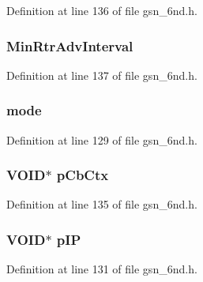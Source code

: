Definition at line 136 of file gsn\_\-6nd.h.

\hypertarget{a00193_af23e4d0983e78423d6d5349772603744}{
\subsubsection[{MinRtrAdvInterval}]{ {\bf MinRtrAdvInterval}}}
\label{a00193_af23e4d0983e78423d6d5349772603744}


Definition at line 137 of file gsn\_\-6nd.h.

\hypertarget{a00193_a7d61d79fa98a45545166420dec0d8f3d}{
\subsubsection[{mode}]{ {\bf mode}}}
\label{a00193_a7d61d79fa98a45545166420dec0d8f3d}


Definition at line 129 of file gsn\_\-6nd.h.

\hypertarget{a00193_a040e2d4627baec5f0f81086400c1b66a}{
\subsubsection[{pCbCtx}]{\setlength{\rightskip}{0pt plus 5cm}VOID$\ast$ {\bf pCbCtx}}}
\label{a00193_a040e2d4627baec5f0f81086400c1b66a}


Definition at line 135 of file gsn\_\-6nd.h.

\hypertarget{a00193_aea015861cc964f97c61cc651f155451e}{
\subsubsection[{pIP}]{\setlength{\rightskip}{0pt plus 5cm}VOID$\ast$ {\bf pIP}}}
\label{a00193_aea015861cc964f97c61cc651f155451e}


Definition at line 131 of file gsn\_\-6nd.h.


